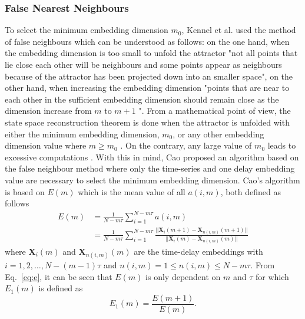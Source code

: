 \documentclass[fleqn,10pt]{wlscirep}
\begin{document}
\subsubsection*{False Nearest Neighbours}
To select the minimum embedding dimension $m_0$, Kennel et al. \cite{kennel1992}
used the method of false neighbours which can be understood as follows:
on the one hand, when the embedding dimension is too small to unfold the 
attractor "not all points that lie close each other will be neighbours and 
some points appear as neighbours because of the attractor has been projected 
down into an smaller space", on the other hand, when increasing the embedding 
dimension "points that are near to each other in the sufficient
embedding dimension should remain close as the dimension increase from $m$ 
to $m+1$ \cite{krakovska2015}".
From a mathematical point of view, the state space reconstruction theorem is 
done when the attractor is unfolded with either the minimum embedding 
dimension, $m_0$, or any other embedding dimension value where 
$m \ge m_0$ \cite{kennel1992}. On the contrary, any large value of $m_0$ 
leads to excessive computations \cite{bradley2015}. With this in mind, 
Cao \cite{Cao1997} proposed an algorithm based on the false neighbour method 
where only the time-series and one delay embedding value are necessary 
to select the minimum embedding dimension. Cao's algorithm is based 
on $E(m)$  which is the mean value of all $a(i,m)$, both defined as follows
\begin{equation}\label{eq:e}
  \begin{aligned}
	E(m) &= \frac{1}{N-m\tau} \sum_{i=1}^{N-m\tau} a(i,m) \\
	 &=
       \frac{1}{N-m\tau} \sum_{i=1}^{N-m\tau}
       \frac{ || \boldsymbol{X}_i(m+1) - \boldsymbol{X}_{n(i,m)}(m+1) || }
            { || \boldsymbol{X}_i(m) - \boldsymbol{X}_{n(i,m)}(m) ||  }
  \end{aligned}
\end{equation}
where $\boldsymbol{X}_i(m)$ and $\boldsymbol{X}_{n(i,m)}(m)$ are the time-delay
embeddings with $i=1,2,\dots,N-(m-1)\tau$ and $ n(i,m)= 1 \le n(i,m) \le N-m\tau$.
From Eq.~\ref{eq:e}, it can be seen that $E(m)$ is only dependent on $m$ 
and $\tau$ for which $E_1(m)$ is defined as
\begin{equation}\label{eq:e1}
E_1(m) = \frac{ E(m+1) } { E(m)}.
\end{equation}
\end{document}
